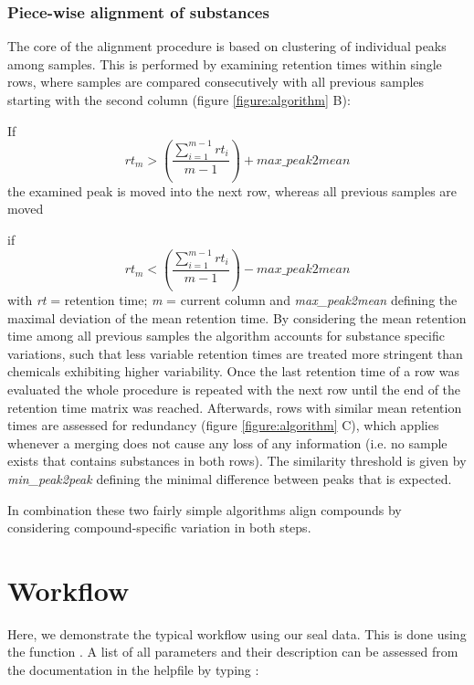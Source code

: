 \subsubsection{Piece-wise alignment of substances}
The core of the alignment procedure is based on clustering of individual peaks among samples. This is performed by examining retention times within single rows, where samples are compared consecutively with all previous samples starting with the second column (figure \ref{figure:algorithm} B):\par
If
\begin{equation}
rt_{m} > \left(\frac{\sum_{i=1}^{m-1}rt_{i}}{m-1}\right) + max{\_}peak2mean
\end{equation}
the examined peak is moved into the next row, whereas all previous samples are moved \par
if
\begin{equation}
rt_{m} < \left(\frac{\sum_{i=1}^{m-1}rt_{i}}{m-1}\right) - max{\_}peak2mean
\end{equation}  
with \textit{rt} = retention time; \textit{m} = current column and \textit{max{\_}peak2mean} defining the maximal deviation of the mean retention time.
\newline By considering the mean retention time among all previous samples the algorithm accounts for substance specific variations, such that less variable retention times are treated more stringent than chemicals exhibiting higher variability. Once the last retention time of a row was evaluated the whole procedure is repeated with the next row until the end of the retention time matrix was reached. Afterwards, rows with similar mean retention times are assessed for redundancy (figure \ref{figure:algorithm} C), which applies whenever a merging does not cause any loss of any information (i.e. no sample exists that contains substances in both rows). The similarity threshold is given by \textit{min{\_}peak2peak} defining the minimal difference between peaks that is expected.
\par In combination these two fairly simple algorithms align compounds by considering compound-specific variation in both steps.

\section{Workflow}
Here, we demonstrate the typical workflow using our seal data. This is done using the function . A list of all parameters and their description can be assessed from the documentation in the helpfile by typing :

